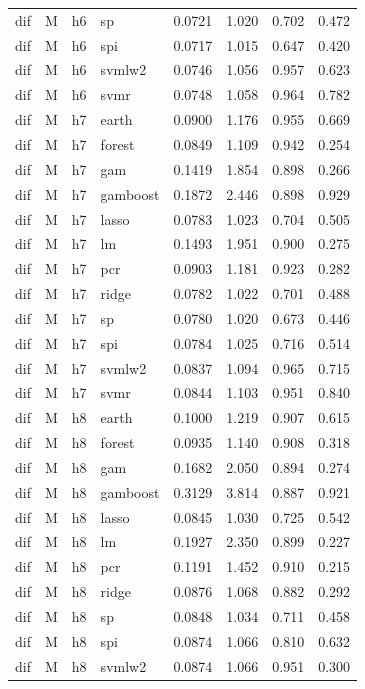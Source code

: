 \begin{ThreePartTable}
\begin{longtable}[t]{llclcccc}
dif & M & h6 & sp & 0.0721 & 1.020 & 0.702 & 0.472\\
dif & M & h6 & spi & 0.0717 & 1.015 & 0.647 & 0.420\\
dif & M & h6 & svmlw2 & 0.0746 & 1.056 & 0.957 & 0.623\\
dif & M & h6 & svmr & 0.0748 & 1.058 & 0.964 & 0.782\\
\addlinespace
dif & M & h7 & earth & 0.0900 & 1.176 & 0.955 & 0.669\\
dif & M & h7 & forest & 0.0849 & 1.109 & 0.942 & 0.254\\
dif & M & h7 & gam & 0.1419 & 1.854 & 0.898 & 0.266\\
dif & M & h7 & gamboost & 0.1872 & 2.446 & 0.898 & 0.929\\
dif & M & h7 & lasso & 0.0783 & 1.023 & 0.704 & 0.505\\
dif & M & h7 & lm & 0.1493 & 1.951 & 0.900 & 0.275\\
dif & M & h7 & pcr & 0.0903 & 1.181 & 0.923 & 0.282\\
dif & M & h7 & ridge & 0.0782 & 1.022 & 0.701 & 0.488\\
dif & M & h7 & sp & 0.0780 & 1.020 & 0.673 & 0.446\\
dif & M & h7 & spi & 0.0784 & 1.025 & 0.716 & 0.514\\
dif & M & h7 & svmlw2 & 0.0837 & 1.094 & 0.965 & 0.715\\
dif & M & h7 & svmr & 0.0844 & 1.103 & 0.951 & 0.840\\
\addlinespace
dif & M & h8 & earth & 0.1000 & 1.219 & 0.907 & 0.615\\
dif & M & h8 & forest & 0.0935 & 1.140 & 0.908 & 0.318\\
dif & M & h8 & gam & 0.1682 & 2.050 & 0.894 & 0.274\\
dif & M & h8 & gamboost & 0.3129 & 3.814 & 0.887 & 0.921\\
dif & M & h8 & lasso & 0.0845 & 1.030 & 0.725 & 0.542\\
dif & M & h8 & lm & 0.1927 & 2.350 & 0.899 & 0.227\\
dif & M & h8 & pcr & 0.1191 & 1.452 & 0.910 & 0.215\\
dif & M & h8 & ridge & 0.0876 & 1.068 & 0.882 & 0.292\\
dif & M & h8 & sp & 0.0848 & 1.034 & 0.711 & 0.458\\
dif & M & h8 & spi & 0.0874 & 1.066 & 0.810 & 0.632\\
dif & M & h8 & svmlw2 & 0.0874 & 1.066 & 0.951 & 0.300\\

\end{longtable}
\end{ThreePartTable}
